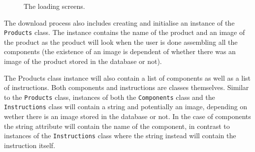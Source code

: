 	\begin{figure}[ht!]
		\centering
   		 \qquad
   		 \qquad
		\caption{The loading screens.}
		\label{downloadLoading}
	\end{figure}

The download process also includes creating and initialise an instance of the \texttt{Products} class. The instance contains the name of the product and an image of the product as the product will look when the user is done assembling all the components (the existence of an image is dependent of whether there was an image of the product stored in the database or not).

The Products class instance will also contain a list of components as well as a list of instructions. Both components and instructions are classes themselves. Similar to the \texttt{Products} class, instances of both the \texttt{Components} class and the \texttt{Instructions} class will contain a string and potentially an image, depending on wether there is an image stored in the database or not. In the case of components the string attribute will contain the name of the component, in contrast to instances of the \texttt{Instructions} class where the string instead will contain the instruction itself.

